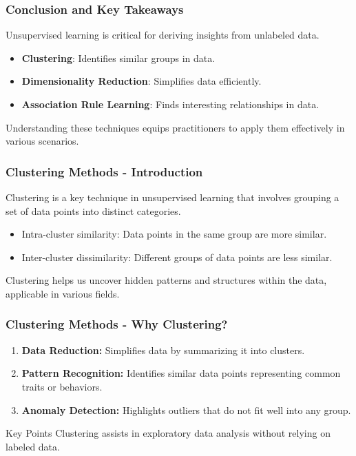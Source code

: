 \documentclass[aspectratio=169]{beamer}
\begin{document}
\begin{frame}[fragile]
    \frametitle{Conclusion and Key Takeaways}
    Unsupervised learning is critical for deriving insights from unlabeled data. 
    \begin{itemize}
        \item \textbf{Clustering}: Identifies similar groups in data.
        \item \textbf{Dimensionality Reduction}: Simplifies data efficiently.
        \item \textbf{Association Rule Learning}: Finds interesting relationships in data.
    \end{itemize}
    Understanding these techniques equips practitioners to apply them effectively in various scenarios.
\end{frame}

\begin{frame}[fragile]
    \frametitle{Clustering Methods - Introduction}
    Clustering is a key technique in unsupervised learning that involves grouping a set of data points into distinct categories. 
    \begin{itemize}
        \item Intra-cluster similarity: Data points in the same group are more similar.
        \item Inter-cluster dissimilarity: Different groups of data points are less similar.
    \end{itemize}
    Clustering helps us uncover hidden patterns and structures within the data, applicable in various fields.
\end{frame}

\begin{frame}[fragile]
    \frametitle{Clustering Methods - Why Clustering?}
    \begin{enumerate}
        \item \textbf{Data Reduction:} Simplifies data by summarizing it into clusters.
        \item \textbf{Pattern Recognition:} Identifies similar data points representing common traits or behaviors.
        \item \textbf{Anomaly Detection:} Highlights outliers that do not fit well into any group.
    \end{enumerate}
    \begin{block}{Key Points}
        Clustering assists in exploratory data analysis without relying on labeled data.
    \end{block}
\end{frame}
\end{document}
